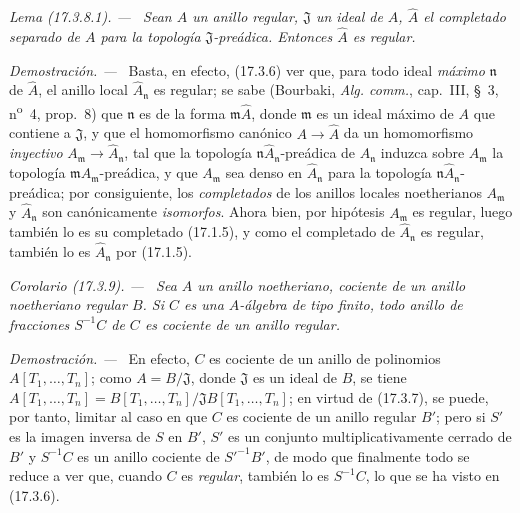 \documentclass[10pt,oneside]{book}
\makeatletter
\newcommand{\setmanualcurrentlabel}[1]{\def\@currentlabel{#1}}
\newcommand{\oldpage}[2][]{%
  \setcounter{footnote}{0}%
  \marginpar{\scriptsize\textbf{#1}~|~#2}\ignorespaces}
\newenvironment{corollary}[1][]{%
  \setmanualcurrentlabel{#1}\par\medskip\noindent\itshape Corolario (#1). ---\ }{\par}
\newenvironment{lemma}[1][]{%
  \setmanualcurrentlabel{#1}\par\medskip\noindent\itshape Lema (#1). ---\ }{\par}
\newenvironment{proof}{%
  \par\medskip\noindent\textit{Demostración. ---\ }}{\par}
\makeatother
\begin{document}
\begin{lemma}[17.3.8.1]
\label{0.17.3.8.1-es}
Sean $A$ un anillo regular, $\mathfrak{J}$ un ideal de $A$,
$\widehat{A}$ el completado separado de $A$ para la topología
$\mathfrak{J}$-preádica. Entonces $\widehat{A}$ es regular.
\end{lemma}

\begin{proof}
Basta, en efecto, (17.3.6) ver que, para todo ideal \emph{máximo}
$\mathfrak{n}$ de $\widehat{A}$, el anillo local
$\widehat{A}_{\mathfrak{n}}$ es regular; se sabe (Bourbaki,
\emph{Alg. comm.}, cap.~III, \S~3, n\textsuperscript{o}~4, prop.~8) que
$\mathfrak{n}$
\oldpage[0\textsubscript{IV-1}]{51}
es de la forma $\mathfrak{m}\widehat{A}$, donde $\mathfrak{m}$ es un ideal
máximo de $A$ que contiene a $\mathfrak{J}$, y que el homomorfismo canónico
$A\to\widehat{A}$ da un homomorfismo \emph{inyectivo}
$A_{\mathfrak{m}}\to\widehat{A}_{\mathfrak{n}}$, tal que la topología
$\mathfrak{n}\widehat{A}_{\mathfrak{n}}$-preádica de
$\widehat{A}_{\mathfrak{n}}$ induzca sobre $A_{\mathfrak{m}}$ la topología
$\mathfrak{m}A_{\mathfrak{m}}$-preádica, y que $A_{\mathfrak{m}}$ sea denso
en $\widehat{A}_{\mathfrak{n}}$ para la topología
$\mathfrak{n}\widehat{A}_{\mathfrak{n}}$-preádica; por consiguiente, los
\emph{completados} de los anillos locales noetherianos $A_{\mathfrak{m}}$ y
$\widehat{A}_{\mathfrak{n}}$ son canónicamente \emph{isomorfos}. Ahora bien,
por hipótesis $A_{\mathfrak{m}}$ es regular, luego también lo es su completado
(17.1.5), y como el completado de $\widehat{A}_{\mathfrak{n}}$ es regular,
también lo es $\widehat{A}_{\mathfrak{n}}$ por (17.1.5).
\end{proof}

\begin{corollary}[17.3.9]
\label{0.17.3.9-es}
Sea $A$ un anillo noetheriano, cociente de un anillo noetheriano regular $B$.
Si $C$ es una $A$-álgebra de tipo finito, todo anillo de fracciones $S^{-1}C$
de $C$ es cociente de un anillo regular.
\end{corollary}

\begin{proof}
En efecto, $C$ es cociente de un anillo de polinomios $A[T_1,\ldots,T_n]$;
como $A=B/\mathfrak{J}$, donde $\mathfrak{J}$ es un ideal de $B$, se tiene
$A[T_1,\ldots,T_n]=B[T_1,\ldots,T_n]/\mathfrak{J}B[T_1,\ldots,T_n]$; en
virtud de (17.3.7), se puede, por tanto, limitar al caso en que $C$ es cociente
de un anillo regular $B'$; pero si $S'$ es la imagen inversa de $S$ en $B'$,
$S'$ es un conjunto multiplicativamente cerrado de $B'$ y $S^{-1}C$ es un anillo
cociente de $S'^{-1}B'$, de modo que finalmente todo se reduce a ver que,
cuando $C$ es \emph{regular}, también lo es $S^{-1}C$, lo que se ha visto en
(17.3.6).
\end{proof}
\end{document}
